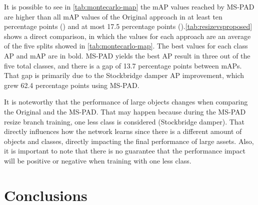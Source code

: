\documentclass[10pt,conference]{IEEEtran}
\begin{document}
It is possible to see in \autoref{tab:montecarlo-map} the mAP values reached by MS-PAD are higher than all mAP values of the Original approach in at least ten percentage points () and at most 17.5 percentage points ().\autoref{tab:resizevsproposed} shows a direct comparison, in which the values for each approach are an average of the five splits showed in \autoref{tab:montecarlo-map}. The best values for each class AP and mAP are in bold. MS-PAD yields the best AP result in three out of the five total classes, and there is a gap of 13.7 percentage points between mAPs. That gap is primarily due to the Stockbridge damper AP improvement, which grew 62.4 percentage points using MS-PAD. 

It is noteworthy that the performance of large objects changes when comparing the Original and the MS-PAD. That may happen because during the MS-PAD resize branch training, one less class is considered (Stockbridge damper). That directly influences how the network learns since there is a different amount of objects and classes, directly impacting the final performance of large assets. Also, it is important to note that there is no guarantee that the performance impact will be positive or negative when training with one less class.

































\section{Conclusions}
\label{sec:conclusion}
\end{document}
